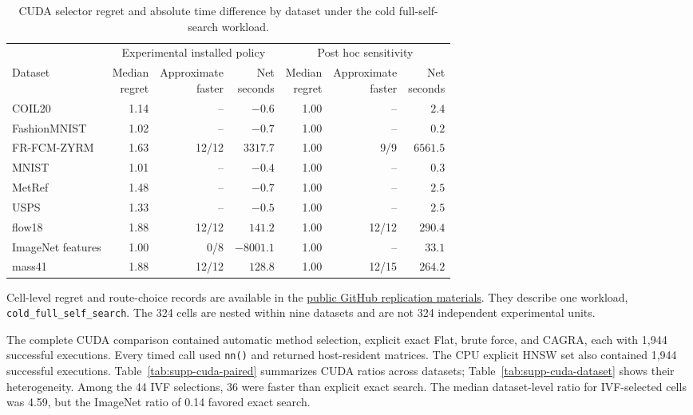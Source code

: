 \documentclass[11pt]{article}
\newcommand{\code}[1]{\texttt{#1}}
\begin{document}
\begin{table}[h]
\centering

\small
\setlength{\tabcolsep}{4pt}
\begin{tabular}{@{}lrrr@{\hspace{5mm}}rrr@{}}
\toprule
& \multicolumn{3}{c}{Experimental installed policy} & \multicolumn{3}{c}{Post hoc sensitivity} \\
\cmidrule(lr){2-4}\cmidrule(lr){5-7}
Dataset & \shortstack{Median\\regret} & \shortstack{Approximate\\faster} & \shortstack{Net\\seconds} & \shortstack{Median\\regret} & \shortstack{Approximate\\faster} & \shortstack{Net\\seconds} \\
\midrule
COIL20 & 1.14 & -- & $-0.6$ & 1.00 & -- & $2.4$ \\
FashionMNIST & 1.02 & -- & $-0.7$ & 1.00 & -- & $0.2$ \\
FR-FCM-ZYRM & 1.63 & 12/12 & $3317.7$ & 1.00 & 9/9 & $6561.5$ \\
MNIST & 1.01 & -- & $-0.4$ & 1.00 & -- & $0.3$ \\
MetRef & 1.48 & -- & $-0.7$ & 1.00 & -- & $2.5$ \\
USPS & 1.33 & -- & $-0.5$ & 1.00 & -- & $2.5$ \\
flow18 & 1.88 & 12/12 & $141.2$ & 1.00 & 12/12 & $290.4$ \\
ImageNet features & 1.00 & 0/8 & $-8001.1$ & 1.00 & -- & $33.1$ \\
mass41 & 1.88 & 12/12 & $128.8$ & 1.00 & 12/15 & $264.2$ \\
\bottomrule
\end{tabular}
\caption{CUDA selector regret and absolute time difference by dataset under the
cold full-self-search workload.}
\label{tab:selector-regret-dataset}
\end{table}

Cell-level regret and route-choice records are available in the
\href{https://github.com/tkcaccia/faissR/tree/main/manuscript/jss}{public
GitHub replication materials}. They describe one workload,
\code{cold\_full\_self\_search}. The 324 cells are nested within nine datasets
and are not 324 independent experimental units.

The complete CUDA comparison contained automatic method selection, explicit exact
Flat, brute force, and CAGRA, each with 1,944 successful executions. Every
timed call used \code{nn()} and returned host-resident matrices. The CPU
explicit HNSW set also contained 1,944 successful executions.
Table~\ref{tab:supp-cuda-paired} summarizes CUDA ratios across datasets;
Table~\ref{tab:supp-cuda-dataset} shows their heterogeneity. Among the 44
IVF selections, 36 were faster than explicit exact search. The median
dataset-level ratio for IVF-selected cells was 4.59, but the ImageNet
ratio of 0.14 favored exact search.
\end{document}
